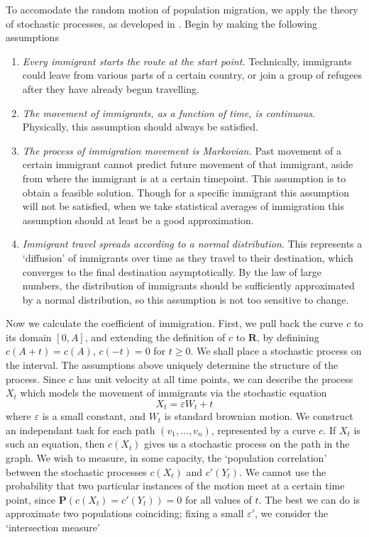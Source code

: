 \documentclass{article}
\begin{document}
\begin{enumerate}
To accomodate the random motion of population migration, we apply the theory of stochastic processes, as developed in \cite{lawler}. Begin by making the following assumptions
%
\begin{enumerate}
    \item {\it Every immigrant starts the route at the start point.} Technically, immigrants could leave from various parts of a certain country, or join a group of refugees after they have already begun travelling.
    \item {\it The movement of immigrants, as a function of time, is continuous}. Physically, this assumption should always be satisfied.
    \item {\it The process of immigration movement is Markovian.} Past movement of a certain immigrant cannot predict future movement of that immigrant, aside from where the immigrant is at a certain timepoint. This assumption is to obtain a feasible solution. Though for a specific immigrant this assumption will not be satisfied, when we take statistical averages of immigration this assumption should at least be a good approximation.
    \item {\it Immigrant travel spreads according to a normal distribution}. This represents a `diffusion' of immigrants over time as they travel to their destination, which converges to the final destination asymptotically. By the law of large numbers, the distribution of immigrants should be sufficiently approximated by a normal distribution, so this assumption is not too sensitive to change.
\end{enumerate}
%
Now we calculate the coefficient of immigration. First, we pull back the curve $c$ to its domain $[0,A]$, and extending the definition of $c$ to $\mathbf{R}$, by definining $c(A + t) = c(A)$, $c(-t) = 0$ for $t \geq 0$. We shall place a stochastic process on the interval. The assumptions above uniquely determine the structure of the process. Since $c$ has unit velocity at all time points, we can describe the process $X_t$ which models the movement of immigrants via the stochastic equation
%
\[ X_t = \varepsilon W_t + t \]
%
where $\varepsilon$ is a small constant, and $W_t$ is standard brownian motion. We construct an independant task for each path $(v_1, \dots, v_n)$, represented by a curve $c$. If $X_t$ is such an equation, then $c(X_t)$ gives us a stochastic process on the path in the graph. We wish to measure, in some capacity, the `population correlation' between the stochastic processes $c(X_t)$ and $c'(Y_t)$. We cannot use the probability that two particular instances of the motion meet at a certain time point, since $\mathbf{P}(c(X_t) = c'(Y_t)) = 0$ for all values of $t$. The best we can do is approximate two populations coinciding; fixing a small $\varepsilon'$, we consider the `intersection measure'

\end{enumerate}
\end{document}
